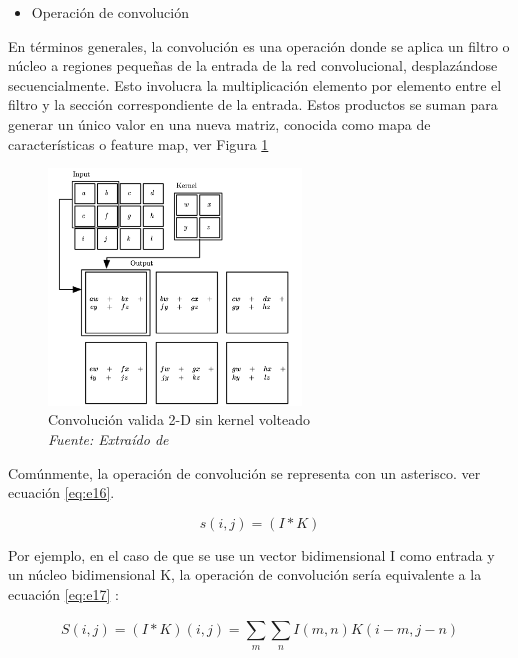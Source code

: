  \begin{itemize}
\item Operación de convolución
 \end{itemize}


En términos generales, la convolución es una operación donde se  aplica un filtro o núcleo a regiones pequeñas de la entrada de la red convolucional, desplazándose secuencialmente. Esto involucra la multiplicación elemento por elemento entre el filtro y la sección correspondiente de la entrada. Estos productos se suman para generar un único valor en una nueva matriz, conocida como mapa de características o feature map, ver Figura \ref{fig:an10}

\begin{figure}[h!]
	\includegraphics[width=0.6\textwidth]{capitulo2/figuras/an10.png}
	\caption{Convolución valida 2-D sin kernel volteado
		\\\textit{Fuente: Extraído de} \protect\cite[p. 334]{goodfellow2016deep}}
	\label{fig:an10}
\end{figure}

Comúnmente, la operación de convolución se representa con un asterisco. ver ecuación \ref{eq:e16}.

\begin{equation} \label{eq:e16} 
	s(i,j)=(I\ast K)
\end{equation}

Por ejemplo, en el caso de que se use un vector bidimensional I como entrada y un núcleo bidimensional K, la operación de convolución sería equivalente a la ecuación \ref{eq:e17} :

\begin{equation} \label{eq:e17} 
	S(i,j)=(I\ast K)(i,j)=\sum_{m}^{}\sum_{n}^{}I(m,n)K(i-m,j-n)
\end{equation}

